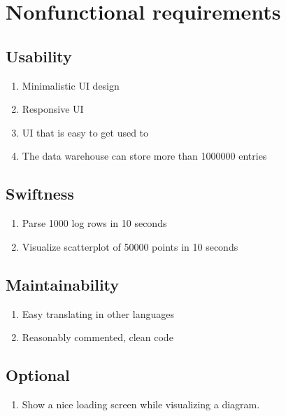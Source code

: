 \section{Nonfunctional requirements}

\renewcommand{\theenumi}{/N\arabic{enumi}0/}
\renewcommand{\labelenumi}{\theenumi}

 
\subsection{Usability}

\begin{enumerate}
  \item Minimalistic UI design
  \item Responsive UI
  \item UI that is easy to get used to
  \label{N1}
  \item The data warehouse can store more than 1000000 entries
\end{enumerate}

\subsection{Swiftness}

\begin{enumerate}[resume] %
	\item Parse 1000 log rows in 10 seconds
	
	\item Visualize scatterplot of 50000 points in 10 seconds
\end{enumerate}

\subsection{Maintainability}

\begin{enumerate}[resume]
  \item Easy translating in other languages
  \item Reasonably commented, clean code
\end{enumerate}


\subsection{Optional}

\begin{enumerate}[resume]
  \item Show a nice loading screen while visualizing a diagram. 
\end{enumerate}